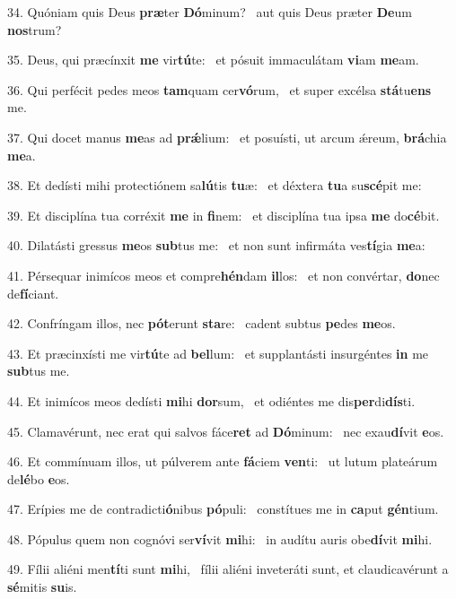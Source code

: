 34. Quóniam quis Deus \textbf{præ}ter \textbf{Dó}minum? \ast\  aut quis Deus præter \textbf{De}um \textbf{nos}trum?\

35. Deus, qui præcínxit \textbf{me} vir\textbf{tú}te: \ast\  et pósuit immaculátam \textbf{vi}am \textbf{me}am.\

36. Qui perfécit pedes meos \textbf{tam}quam cer\textbf{vó}rum, \ast\  et super excélsa \textbf{stá}tu\textbf{ens} me.\

37. Qui docet manus \textbf{me}as ad \textbf{prǽ}lium: \ast\  et posuísti, ut arcum ǽreum, \textbf{brá}chia \textbf{me}a.\

38. Et dedísti mihi protectiónem sa\textbf{lú}tis \textbf{tu}æ: \ast\  et déxtera \textbf{tu}a su\textbf{scé}pit me:\

39. Et disciplína tua corréxit \textbf{me} in \textbf{fi}nem: \ast\  et disciplína tua ipsa \textbf{me} do\textbf{cé}bit.\

40. Dilatásti gressus \textbf{me}os \textbf{sub}tus me: \ast\  et non sunt infirmáta ves\textbf{tí}gia \textbf{me}a:\

41. Pérsequar inimícos meos et compre\textbf{hén}dam \textbf{il}los: \ast\  et non convértar, \textbf{do}nec de\textbf{fí}ciant.\

42. Confríngam illos, nec \textbf{pót}erunt \textbf{sta}re: \ast\  cadent subtus \textbf{pe}des \textbf{me}os.\

43. Et præcinxísti me vir\textbf{tú}te ad \textbf{bel}lum: \ast\  et supplantásti insurgéntes \textbf{in} me \textbf{sub}tus me.\

44. Et inimícos meos dedísti \textbf{mi}hi \textbf{dor}sum, \ast\  et odiéntes me dis\textbf{per}di\textbf{dís}ti.\

45. Clamavérunt, nec erat qui salvos fáce\textbf{ret} ad \textbf{Dó}minum: \ast\  nec exau\textbf{dí}vit \textbf{e}os.\

46. Et commínuam illos, ut púlverem ante \textbf{fá}ciem \textbf{ven}ti: \ast\  ut lutum plateárum de\textbf{lé}bo \textbf{e}os.\

47. Erípies me de contradicti\textbf{ó}nibus \textbf{pó}puli: \ast\  constítues me in \textbf{ca}put \textbf{gén}tium.\

48. Pópulus quem non cognóvi ser\textbf{ví}vit \textbf{mi}hi: \ast\  in audítu auris obe\textbf{dí}vit \textbf{mi}hi.\

49. Fílii aliéni men\textbf{tí}ti sunt \textbf{mi}hi, \ast\  fílii aliéni inveteráti sunt, et claudicavérunt a \textbf{sé}mitis \textbf{su}is.\

